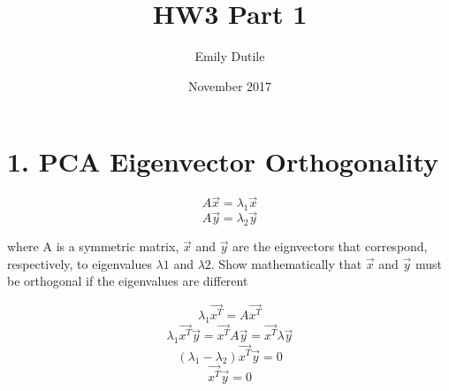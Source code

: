 \documentclass{neu_handout}
\title{HW3 Part 1}
\author{Emily Dutile}
\date{November 2017}
\begin{document}
\section*{1. PCA Eigenvector Orthogonality}

$$A\vec{x} = \lambda_1 \vec{x}$$
$$A\vec{y} = \lambda_2 \vec{y}$$

where A is a symmetric matrix, ${\vec{x}}$ and $\vec{y}$ are the eignvectors that correspond, respectively, to eigenvalues
$\lambda1$ and $\lambda2$. Show mathematically that $\vec{x}$ and $\vec{y}$ must be orthogonal if the eigenvalues are different

$$ \lambda_1 \vec{x^T} = A \vec{x^T} $$
$$ \lambda_1 \vec{x^T} \vec{y} = \vec{x^T} A \vec{y} = \vec{x^T} \lambda \vec{y} $$
$$ (\lambda_1 - \lambda_2) \vec{x^T} \vec{y} = 0 $$
$$ \vec{x^T} \vec{y} = 0 $$
\end{document}
